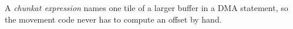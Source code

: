 A \emph{chunkat expression} names one tile of a larger buffer in a DMA statement, so the movement code never has to compute an offset by hand.
